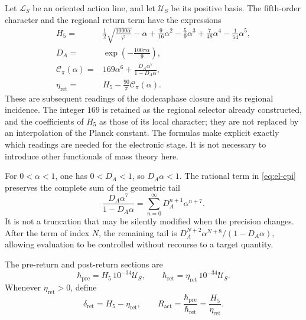 Let \(\mathcal L_S\) be an oriented action line, and let \(\mathcal U_S\)
be its positive basis. The fifth-order character and the regional
return term have the expressions
\begin{align}
 H_5={}&\frac12\sqrt{\frac{1000\alpha}{\varphi}}-\alpha
   +\frac9{16}\alpha^2-\frac59\alpha^3
   +\frac7{48}\alpha^4-\frac1{54}\alpha^5,
   \label{eq:el-h5}\\
 D_A={}&\exp\!\left(-\frac{100\pi\alpha}{9}\right),
   \label{eq:el-da}\\
 \mathcal C_\pi(\alpha)={}&169\alpha^6+
       \frac{D_A\alpha^7}{1-D_A\alpha},
   \label{eq:el-cpi}\\
 \eta_{\mathrm{ret}}={}&H_5-\frac{90}{\pi}\mathcal C_\pi(\alpha).
   \label{eq:el-eta}
\end{align}
These are subsequent readings of the dodecaphase closure and its
regional incidence. The integer \(169\) is retained as the regional
selector already constructed, and the coefficients of \(H_5\) as those of its
local character; they are not replaced by an interpolation of the Planck
constant. The formulas make explicit exactly which readings are needed
for the electronic stage. It is not necessary to introduce other
functionals of mass theory here.

For \(0<\alpha<1\), one has \(0<D_A<1\), so
\(D_A\alpha<1\). The rational term in \eqref{eq:el-cpi} preserves the
complete sum of the geometric tail
\begin{equation}
 \frac{D_A\alpha^7}{1-D_A\alpha}
 =\sum_{n=0}^{\infty}D_A^{n+1}\alpha^{n+7}.
 \label{eq:el-cola-regional}
\end{equation}
It is not a truncation that may be silently modified when the precision
changes. After the term of index \(N\), the remaining tail is
\(D_A^{N+2}\alpha^{N+8}/(1-D_A\alpha)\), allowing evaluation to be
controlled without recourse to a target quantity.

\begin{definition}
The pre-return and post-return sections are
\begin{equation}
 \hbar_{\mathrm{pre}}=H_5\,10^{-34}\mathcal U_S,
 \qquad
 \hbar_{\mathrm{ret}}=\eta_{\mathrm{ret}}\,10^{-34}\mathcal U_S.
 \label{eq:el-secciones-accion}
\end{equation}
Whenever \(\eta_{\mathrm{ret}}>0\), define
\begin{equation}
 \delta_{\mathrm{ret}}=H_5-\eta_{\mathrm{ret}},\qquad
 R_{\mathrm{act}}=\frac{\hbar_{\mathrm{pre}}}{\hbar_{\mathrm{ret}}}
 =\frac{H_5}{\eta_{\mathrm{ret}}}.
 \label{eq:el-ratio}
\end{equation}
\end{definition}

